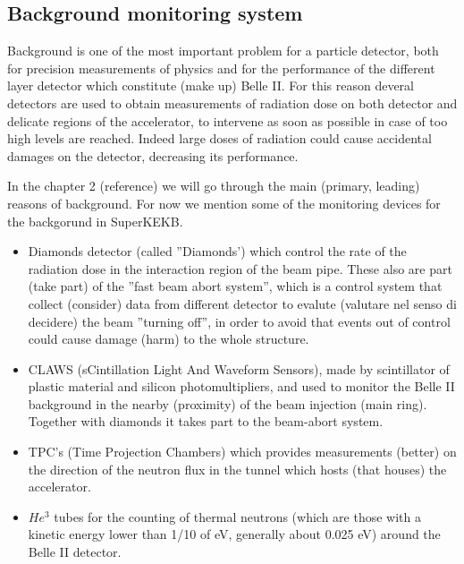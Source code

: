 




\subsection{Background monitoring system}

Background is one of the most important problem for a particle detector, both for precision measurements of physics and for the performance of the different layer detector which constitute (make up) Belle II. For this reason deveral detectors are used to obtain measurements of radiation dose on both detector and delicate regions of the accelerator, to intervene as soon as possible in case of too high levels are reached. Indeed large doses of radiation could cause accidental damages on the detector, decreasing its performance.

In the chapter 2 (reference) we will go through the main (primary, leading) reasons of background. For now we mention some of the monitoring devices for the backgorund in SuperKEKB.


\begin{itemize}
\item Diamonds detector (called ''Diamonds') which control the rate of the radiation dose in the interaction region of the beam pipe. These also are part (take part) of the ''fast beam abort system'', which is a control system that collect (consider) data from different detector to evalute (valutare nel senso di decidere) the beam ''turning off'', in order to avoid that events out of control could cause damage (harm) to the whole structure.
\item CLAWS (sCintillation Light And Waveform Sensors), made by scintillator of plastic material and silicon photomultipliers, and used to monitor the Belle II background in the nearby (proximity) of the beam injection (main ring). Together with diamonds it takes part to the beam-abort system.
\item TPC's (Time Projection Chambers) which provides measurements (better) on the direction of the neutron flux in the tunnel which hosts (that houses) the accelerator.
\item $He^{3}$ tubes for the counting of thermal neutrons (which are those with a kinetic energy lower than 1/10 of eV, generally about 0.025 eV) around the Belle II detector.
\end{itemize}


